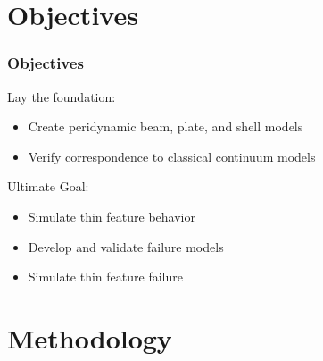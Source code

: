 \documentclass{beamer}
\begin{document}
\section{Objectives}
%
\begin{frame}
  \frametitle{Objectives}
    Lay the foundation:
    \begin{itemize}
    \item Create peridynamic beam, plate, and shell models
    \item Verify correspondence to classical continuum models
  \end{itemize}
  Ultimate Goal:
  \begin{itemize}
    \item Simulate thin feature behavior
    \item Develop and validate failure models
    \item Simulate thin feature failure
  \end{itemize}
\end{frame}
%
%
\section{Methodology}
%
\end{document}
